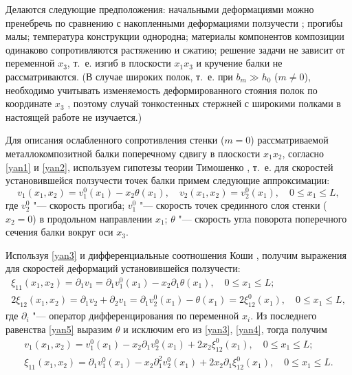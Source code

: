 Делаются следующие предположения: начальными деформациями можно пренебречь по сравнению с накопленными деформациями ползучести \cite{yan:bib4, yan:bib5}; прогибы малы; температура конструкции однородна; материалы компонентов композиции одинаково сопротивляются растяжению и сжатию; решение задачи не зависит от переменной $x_3$, т.~е. изгиб в плоскости $x_1x_3$ и кручение балки не рассматриваются. (В случае широких полок, т.~е. при $b_m\gg h_0$ (${m\ne0}$), необходимо учитывать изменяемость деформированного стояния полок по координате $x_3$ \cite{yan:bib10}, поэтому случай тонкостенных стержней с широкими полками в настоящей работе не изучается.)

Для описания ослабленного сопротивления стенки ($m=0$) рассматриваемой металлокомпозитной балки поперечному сдвигу в плоскости $x_1x_2$, согласно \eqref{yan1} и \eqref{yan2}, используем гипотезы теории Тимошенко \cite{yan:bib11, yan:bib12}, т.~е. для скоростей установившейся ползучести точек балки примем следующие аппроксимации:
\begin{equation}
\label{yan3}
v_1(x_1,x_2)=v_1^0(x_1)-x_2\theta(x_1),\quad v_2(x_1,x_2)=v_2^0(x_1),\quad 0\le x_1\le L,
\end{equation}
где $v_2^0$ "--- скорость прогиба; $v_1^0$ "--- скорость точек срединного слоя стенки (${x_2{=}0}$) в продольном направлении $x_1$; $\theta$ "--- скорость угла поворота поперечного сечения балки вокруг оси $x_3$.

Используя \eqref{yan3} и дифференциальные соотношения Коши \cite{yan:bib4, yan:bib5}, получим выражения для скоростей деформаций установившейся ползучести:
\begin{gather}
\label{yan4}
\xi_{11}(x_1,x_2)=\partial_1 v_1=\partial_1v_1^0(x_1)-x_2\partial_1\theta(x_1),\quad 0\le x_1\le L;
\\
\label{yan5}
2\xi_{12}(x_1,x_2)=\partial_1v_2+\partial_2v_1=\partial_1v_2^0(x_1)-\theta(x_1)=2\xi_{12}^0(x_1),\quad 0\le x_1\le L,
\end{gather}
где $\partial_i$ "--- оператор дифференцирования по переменной $x_i$. Из последнего равенства \eqref{yan5} выразим $\theta$ и исключим его из \eqref{yan3}, \eqref{yan4}, тогда получим
\begin{gather}
\label{yan6}
v_1(x_1,x_2)=v_1^0(x_1)-x_2\partial_1v_2^0(x_1)+2x_2\xi_{12}^0(x_1),\quad 0\le x_1\le L;
\\
\label{yan7}
\xi_{11}(x_1,x_2)=\partial_1v_1^0(x_1)-x_2\partial_1^2 v_2^0(x_1)+2x_2\partial_1\xi_{12}^0(x_1),\quad 0\le x_1\le L.
\end{gather}

